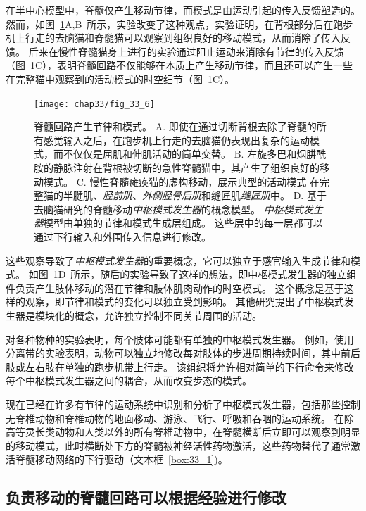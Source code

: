 在半中心模型中，脊髓仅产生移动节律，而模式是由运动引起的传入反馈塑造的。
然而，如图~\ref{fig:33_6}A,B~所示，实验改变了这种观点，实验证明，在背根部分后在跑步机上行走的去脑猫和脊髓猫可以观察到组织良好的移动模式，从而消除了传入反馈。
后来在慢性脊髓猫身上进行的实验通过阻止运动来消除有节律的传入反馈（图~\ref{fig:33_6}C），表明脊髓回路不仅能够在本质上产生移动节律，而且还可以产生一些在完整猫中观察到的活动模式的时空细节（图~\ref{fig:33_6}C）。


\begin{figure}[htbp]
	\centering
	\texttt{[image: chap33/fig\_33\_6]}
	\caption{脊髓回路产生节律和模式。
	A. 即使在通过切断背根去除了脊髓的所有感觉输入之后，在跑步机上行走的去脑猫仍表现出复杂的运动模式，而不仅仅是屈肌和伸肌活动的简单交替\cite{grillner1984effect}。
	B. 左旋多巴和烟肼酰胺的静脉注射在背根被切断的急性脊髓猫中，其产生了组织良好的移动模式\cite{grillner1979central}。
	C. 慢性脊髓瘫痪猫的虚构移动，展示典型的活动模式 在完整猫的半腱肌、\textit{胫前肌}、\textit{外侧胫骨后肌}和缝匠肌\textit{缝匠肌}中\cite{pearson1991fictive}。
	D. 基于去脑猫研究的脊髓移动\textit{中枢模式发生器}的概念模型。
	\textit{中枢模式发生器}模型由单独的节律和模式生成层组成。
	这些层中的每一层都可以通过下行输入和外围传入信息进行修改\cite{rybak2006modelling}。}
	\label{fig:33_6}
\end{figure}


这些观察导致了\textit{中枢模式发生器}的重要概念，它可以独立于感官输入生成节律和模式。
如图~\ref{fig:33_6}D~所示，随后的实验导致了这样的想法，即中枢模式发生器的独立组件负责产生肢体移动的潜在节律和肢体肌肉动作的时空模式。
这个概念是基于这样的观察，即节律和模式的变化可以独立受到影响。
其他研究提出了中枢模式发生器是模块化的概念，允许独立控制不同关节周围的活动。


对各种物种的实验表明，每个肢体可能都有单独的中枢模式发生器。
例如，使用分离带的实验表明，动物可以独立地修改每对肢体的步进周期持续时间，其中前后肢或左右肢在单独的跑步机带上行走。
该组织将允许相对简单的下行命令来修改每个中枢模式发生器之间的耦合，从而改变步态的模式。


现在已经在许多有节律的运动系统中识别和分析了中枢模式发生器，包括那些控制无脊椎动物和脊椎动物的地面移动、游泳、飞行、呼吸和吞咽的运动系统。
在除高等灵长类动物和人类以外的所有脊椎动物中，在脊髓横断后立即可以观察到明显的移动模式，此时横断处下方的脊髓被神经活性药物激活，这些药物替代了通常激活脊髓移动网络的下行驱动（文本框~\ref{box:33_1})。



\subsection{负责移动的脊髓回路可以根据经验进行修改}

